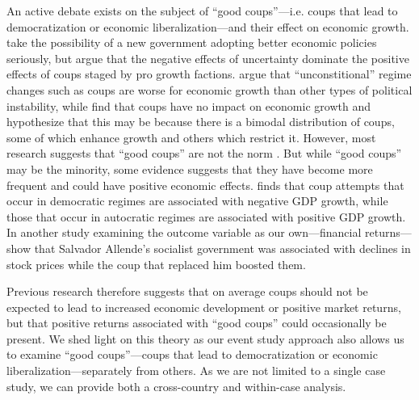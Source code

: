 \documentclass[12pt,final,fleqn]{article}
\theoremstyle{plain}
\begin{document}
An active debate exists on the subject of ``good coups''---i.e. coups that lead to democratization or economic liberalization---and their effect on economic growth. \citet{alesina1996political} take the possibility of a new government adopting better economic policies seriously, but argue that the negative effects of uncertainty dominate the positive effects of coups staged by pro growth factions. \citet{alesina1996income} argue that ``unconstitional'' regime changes such as coups are worse for economic growth than other types of political instability, while \citet{londregan1990poverty} find that coups have no impact on economic growth and hypothesize that this may be because there is a bimodal distribution of coups, some of which enhance growth and others which restrict it. However, most research suggests that ``good coups'' are not the norm \citep{derpanopoulos2015coups, powell2011global, thyne2016coup, varol2011democratic}. But while ``good coups'' may be the minority, some evidence suggests that they have become more frequent \citep{marinov2014coups} and could have positive economic effects. \citet{meyersson2016political} finds that coup attempts that occur in democratic regimes are associated with negative GDP growth, while those that occur in autocratic regimes are associated with positive GDP growth. In another study examining the outcome variable as our own---financial returns---\citet{girardi2018institution} show that Salvador Allende's socialist government was associated with declines in stock prices while the coup that replaced him boosted them. 

Previous research therefore suggests that on average coups should not be expected to lead to increased economic development or positive market returns, but that positive returns associated with ``good coups'' could occasionally be present. We shed light on this theory as our event study approach also allows us to examine ``good coups''---coups that lead to democratization or economic liberalization---separately from others. As we are not limited to a single case study, we can provide both a cross-country and within-case analysis. 
\end{document}
